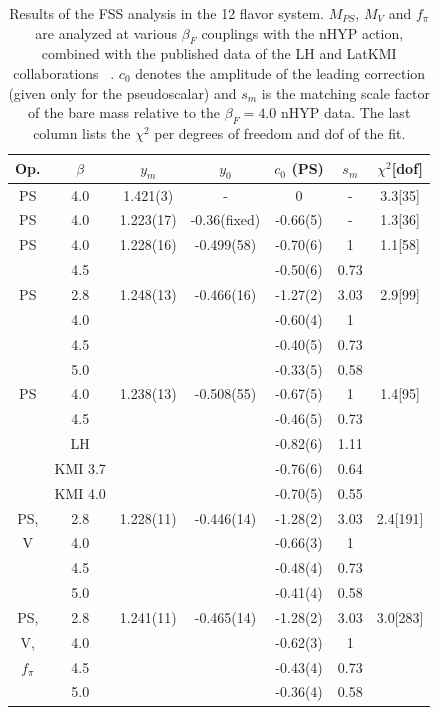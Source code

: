 \documentclass[aps,prl,twocolumn,]{revtex4-1}  %
\begin{document}
\begin{table}[tdp]
\begin{center}
\begin{tabular}{|c|c|c|c|c|c|c|}
\hline
Op. & $\beta$ & $y_m$ & $y_0$ & $c_0$ (PS) &  $ s_m $  & $\chi^2$[dof]   \\
\hline\hline
PS	&	4.0	& 	1.421(3)	&	 - 		    &	0	        &	-	    	&	3.3[35]	\\
\hline
PS	&	4.0	&	1.223(17)	&	-0.36(fixed)	    &	-0.66(5)	&	-	    	&	1.3[36] \\
\hline
PS	&	4.0	& 	1.228(16)	&	 -0.499(58) &	-0.70(6)	&	1	    &   1.1[58] \\
	&	4.5	&		        &			    &	-0.50(6)	&	0.73   &	 	        \\
\hline
PS	&	2.8	& 	1.248(13)	&	 -0.466(16) &	-1.27(2)	&	3.03    &	2.9[99] \\
	&	4.0	& 	         	&	        	&	-0.60(4)	&	1	    &		    \\
	&	4.5	&		        &		        &	-0.40(5)	&	0.73	&	        \\
	&	5.0	&		        &		        &	-0.33(5)	&	0.58	&	        \\
\hline
PS	&	4.0	& 	1.238(13)	&	 -0.508(55) &	-0.67(5)	&	1	    &	1.4[95] \\
	&	4.5	&		        &		        &	-0.46(5)	&	0.73	&	        \\
	&	LH&&		&	-0.82(6)  &	1.11 	& 	 \\
	&	KMI 3.7&&	&	-0.76(6)	&	0.64    &	 	 \\
	&	KMI 4.0&& &	-0.70(5)	&	0.55    &	\\
\hline
PS,&	2.8	& 	1.228(11)	&	 -0.446(14) &	-1.28(2) 	&	3.03	    &	2.4[191] \\
V	&	4.0	& 	         	&	        	&	-0.66(3)   & 	1	    &		    \\
	&	4.5	&		        &		        &	-0.48(4) 	&	0.73	&	        \\
	&	5.0	&		        &		        &	-0.41(4) 	&	0.58	&	        \\
\hline
PS,&   2.8	&1.241(11)&-0.465(14)  &	-1.28(2)	    &	3.03	&   3.0[283] \\
V,	&	4.0	&		        &			    &	-0.62(3)	&	1       &	 	        \\
$f_\pi$&	4.5	&		        &			    &	-0.43(4)	&	0.73    &	 	        \\
	&	5.0	&		        &			    &	-0.36(4)	&	0.58    &	 	        \\
\hline
\end{tabular}

\end{center}
 \caption{Results of the FSS analysis in the 12 flavor system. $M_{PS}$,  $M_V$ and $f_\pi$ are analyzed at various $\beta_F$ couplings with the nHYP action, combined with the published data of the LH and LatKMI collaborations ~\protect\cite{Fodor:2011tu,Aoki:2012eq}.  
 $c_0$ denotes the amplitude of the leading correction (given only for the pseudoscalar)  and $s_m$ is the matching scale factor of the bare mass relative to the $\beta_F=4.0$ nHYP data. The last column lists the $\chi^2$ per degrees of freedom and dof of the fit.  }


\label{table:results}
\end{table}
\end{document}
